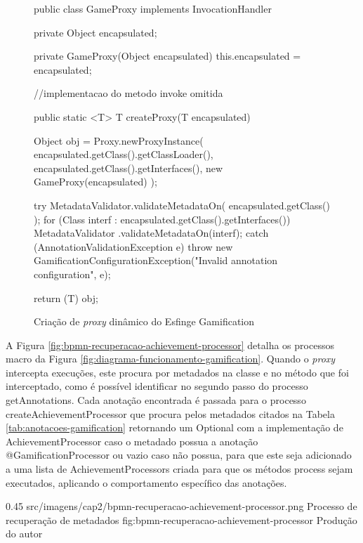 \begin{figure}[H]
    \centering
    \caption{Criação de \textit{proxy} dinâmico do Esfinge Gamification}
    \begin{java}
public class GameProxy implements InvocationHandler {
        private Object encapsulated;

	private GameProxy(Object encapsulated) {
		this.encapsulated = encapsulated;
        }
        
//implementacao do metodo invoke omitida
    
	public static <T> T createProxy(T encapsulated) {
		Object obj = Proxy.newProxyInstance(
		        encapsulated.getClass().getClassLoader(),
			encapsulated.getClass().getInterfaces(), 
			new GameProxy(encapsulated)
		);

		try {
			MetadataValidator.validateMetadataOn(
			    encapsulated.getClass()
			);
			for (Class interf : encapsulated.getClass().getInterfaces()) {
				MetadataValidator
				.validateMetadataOn(interf);
			}
		} catch (AnnotationValidationException e) {
			throw new GamificationConfigurationException("Invalid annotation configuration", e);
		}

		return (T) obj;
	}
}
    \end{java}
    \label{fig:gamification-proxy}
\end{figure}

A Figura \ref{fig:bpmn-recuperacao-achievement-processor} detalha os processos macro da Figura \ref{fig:diagrama-funcionamento-gamification}. Quando o \textit{proxy} intercepta execuções, este procura por metadados na classe e no método que foi interceptado, como é possível identificar no segundo passo do processo getAnnotations. %
Cada anotação encontrada é passada para o processo createAchievementProcessor que procura pelos metadados citados na Tabela \ref{tab:anotacoes-gamification} retornando um Optional com a implementação de AchievementProcessor caso o metadado possua a anotação @GamificationProcessor ou vazio caso não possua, para que este seja adicionado a uma lista de AchievementProcessors criada para que os métodos process sejam executados, aplicando o comportamento específico das anotações.

\begin{image}
{0.45} %
{src/imagens/cap2/bpmn-recuperacao-achievement-processor.png} %
{Processo de recuperação de metadados} %
{fig:bpmn-recuperacao-achievement-processor} %
{Produção do autor} %
\end{image}

